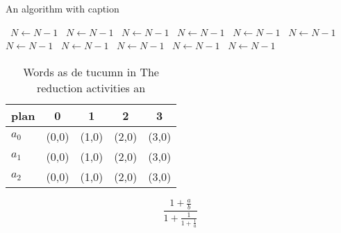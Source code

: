\documentclass[a4paper]{article}
\begin{document}
\begin{algorithm}
\caption{An algorithm with caption}
\begin{algorithmic}
\    \State $N \gets N - 1$
\    \State $N \gets N - 1$
\    \State $N \gets N - 1$
\    \State $N \gets N - 1$
\    \State $N \gets N - 1$
\    \State $N \gets N - 1$
\    \State $N \gets N - 1$
\    \State $N \gets N - 1$
\    \State $N \gets N - 1$
\    \State $N \gets N - 1$
\    \State $N \gets N - 1$
\EndWhile
\end{algorithmic}
\end{algorithm}

\begin{table}
\begin{adjustbox}{width=0.6\columnwidth}
\begin{tabular}{|l|l|l|l|l|}
\hline
\textbf{plan} & \multicolumn{1}{c|}{\textbf{0}} & \multicolumn{1}{c|}{\textbf{1}} & \multicolumn{1}{c|}{\textbf{2}} & \multicolumn{1}{c|}{\textbf{3}} \\ \hline
\textbf{$a_0$}  & (0,0) & (1,0) & (2,0) & (3,0) \\ \hline
\textbf{$a_1$}  & (0,0) & (1,0) & (2,0) & (3,0) \\ \hline
\textbf{$a_2$}  & (0,0) & (1,0) & (2,0) & (3,0) \\ \hline
\end{tabular}
\end{adjustbox}
\caption{Words as de tucumn in The reduction activities an
}
\end{table}

\[ \frac{1+\frac{a}{b}}{1+\frac{1}{1+\frac{1}{a}}} \]
\end{document}
